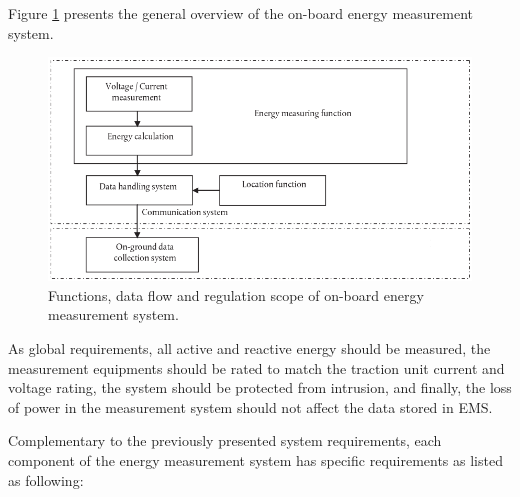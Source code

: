 \newpage

Figure \ref{fig:EMS} presents the general overview of the on-board energy measurement system.

\begin{figure}[h!]
	\centering
	\includegraphics[width=\textwidth,keepaspectratio]{figures/34.SmartM/EMS}
	\caption{Functions, data flow and regulation scope of on-board energy measurement system.}
	\label{fig:EMS}
\end{figure}

As global requirements, all active and reactive energy should be measured, the measurement equipments should be rated to match the traction unit current and voltage rating, the system should be protected from intrusion, and finally, the loss of power in the  measurement system should not affect the data stored in \ac{EMS}.

Complementary to the previously presented system requirements, each component of the energy measurement system has specific requirements as listed as following:

